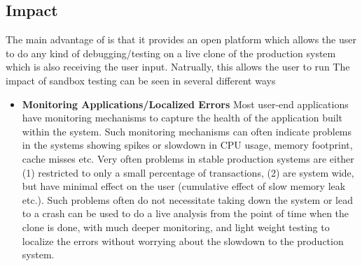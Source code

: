 \subsection{Impact}
\label{sec:impact}

The main advantage of \parikshan is that it provides an open platform which allows the user to do any kind of debugging/testing on a live clone of the production system which is also receiving the user input.
Natrually, this allows the user to run 
The impact of sandbox testing can be seen in several different ways

\begin{itemize}

  \item \textbf{Monitoring Applications/Localized Errors}
Most user-end applications have monitoring mechanisms to capture the health of the application built within the system.
Such monitoring mechanisms can often indicate problems in the systems showing spikes or slowdown in CPU usage, memory footprint, cache misses etc.
Very often problems in stable production systems are either (1) restricted to only a small percentage of transactions, (2) are system wide, but have minimal effect on the user (cumulative effect of slow memory leak etc.).
Such problems often do not necessitate taking down the system or lead to a crash
\parikshan can be used to do a live analysis from the point of time when the clone is done, with much deeper monitoring, and light weight testing to localize the errors without worrying about the slowdown to the production system.


\end{itemize}
